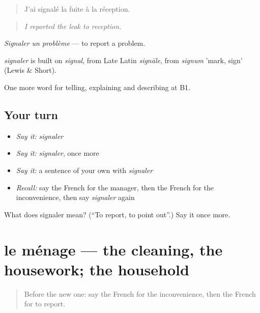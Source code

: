 \begin{quote}
J'ai signalé la fuite à la réception.
\end{quote}

\begin{quote}
\emph{I reported the leak to reception.}
\end{quote}

\emph{Signaler un problème} — to report a problem.

\begin{cousinweb}
\emph{signaler} is built on \emph{signal}, from Late Latin \emph{signāle}, from \emph{signum} 'mark, sign' (Lewis \& Short).
\end{cousinweb}

\begin{grammarlens}[title={What you've built}]
One more word for telling, explaining and describing at B1.
\end{grammarlens}

\subsection*{Your turn}
\begin{itemize}
\raggedright
  \item \emph{Say it:} \emph{signaler}
  \item \emph{Say it:} \emph{signaler}, once more
  \item \emph{Say it:} a sentence of your own with \emph{signaler}
  \item \emph{Recall:} say the French for the manager, then the French for the inconvenience, then say \emph{signaler} again
\end{itemize}

\begin{tcolorbox}[breakable,colback=teal!4,colframe=teal!35!black,title={Before you move on}]
What does signaler mean? (\textquotedblleft{}To report, to point out\textquotedblright{}.) Say it once more.
\end{tcolorbox}
\section[le ménage]{le ménage — the cleaning, the housework; the household}

\label{lesson:FR-C432-menage}



\begin{quote}
Before the new one: say the French for the inconvenience, then the French for to report.
\end{quote}

